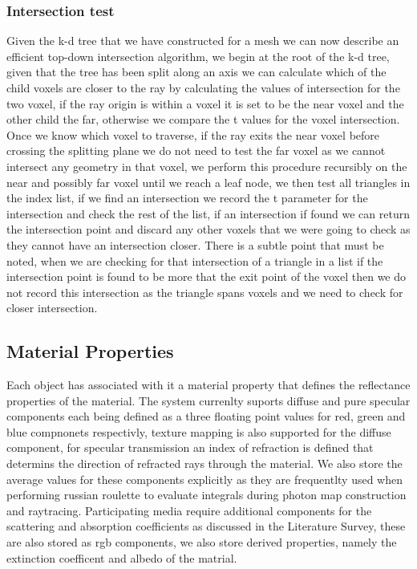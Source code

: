 \subsubsection{Intersection test}
Given the k-d tree that we have constructed for a mesh we can now describe an efficient top-down intersection algorithm,
we begin at the root of the k-d tree, given that the tree has been split along an axis we can calculate which of the
child voxels are closer to the ray by calculating the values of intersection for the two voxel, if the ray origin is
within a voxel it is set to be the near voxel and the other child the far, otherwise we compare the t values for the
voxel intersection. Once we know which voxel to traverse, if the ray exits the near voxel before crossing the splitting
plane we do not need to test the far voxel as we cannot intersect any geometry in that voxel, we perform this procedure
recursibly on the near and possibly far voxel until we reach a leaf node, we then test all triangles in the index list,
if we find an intersection we record the t parameter for the intersection and check the rest of the list, if an intersection
if found we can return the intersection point and discard any other voxels that we were going to check as they cannot
have an intersection closer. There is a subtle point that must be noted, when we are checking for that intersection of
a triangle in a list if the intersection point is found to be more that the exit point of the voxel then we do not
record this intersection as the triangle spans voxels and we need to check for closer intersection.

\subsection{Material Properties}
Each object has associated with it a material property that defines the reflectance properties of the material.
The system currenlty suports diffuse and pure specular components each being defined as a three floating point
values for red, green and blue compnonets respectivly, texture mapping is also supported for the diffuse component,
for specular transmission an index of refraction is defined that determins the direction of refracted rays through the
material. We also store the average values for these components explicitly as they are frequentlty used when performing
russian roulette to evaluate integrals during photon map construction and raytracing. Participating media require additional
components for the scattering and absorption coefficients as discussed in the Literature Survey, these are also stored
as rgb components, we also store derived properties, namely the extinction coefficent and albedo of the matrial.

